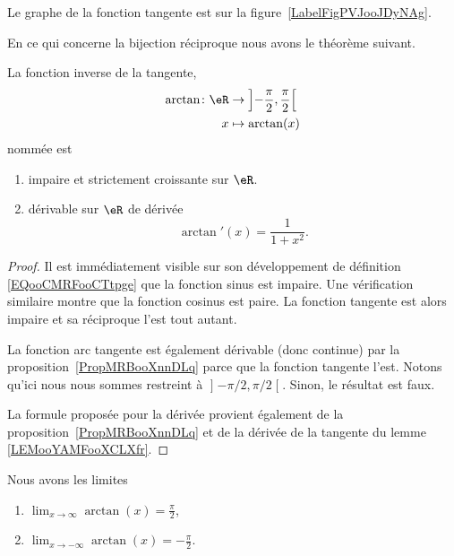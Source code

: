 Le graphe de la fonction tangente est sur la figure~\ref{LabelFigPVJooJDyNAg}. %
\newcommand{\CaptionFigPVJooJDyNAg}{Le graphe de la fonction tangente.}


En ce qui concerne la bijection réciproque nous avons le théorème suivant.
\begin{theorem}     \label{THOooUSVGooOAnCvC}
	La fonction inverse de la tangente,
	\begin{equation}
		\begin{aligned}
			\arctan\colon \eR & \to \left] -\frac{ \pi }{2} , \frac{ \pi }{2} \right[ \\
			x                 & \mapsto \arctan(x)
		\end{aligned}
	\end{equation}
	nommée  est
	\begin{enumerate}
		\item
		      impaire et strictement croissante sur \( \eR\).
		\item       \label{ITEMooMNHLooOVhIIb}
		      dérivable sur \( \eR\) de dérivée
		      \begin{equation}        \label{EQooGCHGooPlwYWt}
			      \arctan'(x)=\frac{1}{ 1+x^2 }.
		      \end{equation}
	\end{enumerate}
\end{theorem}

\begin{proof}
	Il est immédiatement visible sur son développement de définition \eqref{EQooCMRFooCTtpge} que la fonction sinus est impaire. Une vérification similaire montre que la fonction cosinus est paire. La fonction tangente est alors impaire et sa réciproque l'est tout autant.

	La fonction arc tangente est également dérivable (donc continue) par la proposition~\ref{PropMRBooXnnDLq} parce que la fonction tangente l'est. Notons qu'ici nous nous sommes restreint à \( \mathopen] -\pi/2 , \pi/2 \mathclose[\). Sinon, le résultat est faux.

	La formule proposée pour la dérivée provient également de la proposition~\ref{PropMRBooXnnDLq} et de la dérivée de la tangente du lemme \ref{LEMooYAMFooXCLXfr}.
\end{proof}

\begin{lemma}       \label{LEMooHRDCooGtnyeQ}
	Nous avons les limites
	\begin{enumerate}
		\item
		      \( \lim_{x\to \infty} \arctan(x)=\frac{ \pi }{2}\),
		\item
		      \( \lim_{x\to -\infty} \arctan(x)=-\frac{ \pi }{2}\).
	\end{enumerate}
\end{lemma}

